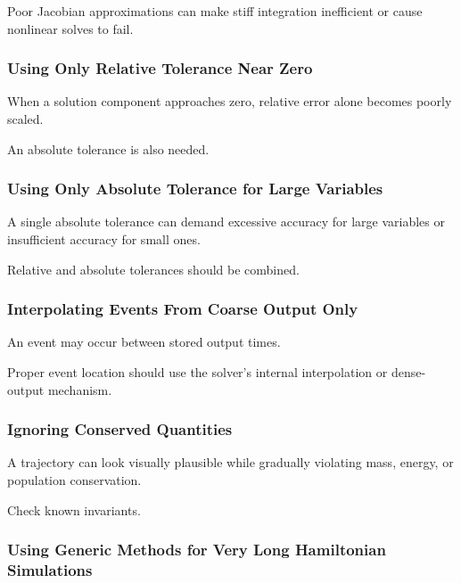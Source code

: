 Poor Jacobian approximations can make stiff integration inefficient or
cause nonlinear solves to fail.

\subsubsection{Using Only Relative Tolerance Near Zero}

When a solution component approaches zero, relative error alone becomes
poorly scaled.

An absolute tolerance is also needed.

\subsubsection{Using Only Absolute Tolerance for Large Variables}

A single absolute tolerance can demand excessive accuracy for large
variables or insufficient accuracy for small ones.

Relative and absolute tolerances should be combined.

\subsubsection{Interpolating Events From Coarse Output Only}

An event may occur between stored output times.

Proper event location should use the solver's internal interpolation or
dense-output mechanism.

\subsubsection{Ignoring Conserved Quantities}

A trajectory can look visually plausible while gradually violating mass,
energy, or population conservation.

Check known invariants.

\subsubsection{Using Generic Methods for Very Long Hamiltonian Simulations}

